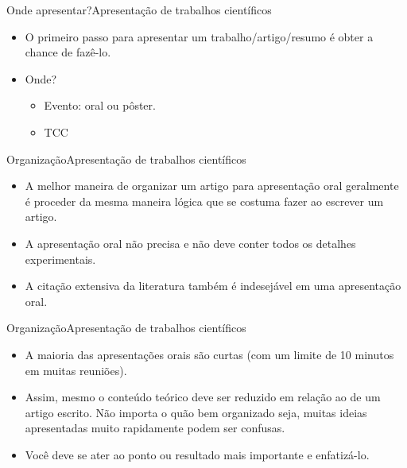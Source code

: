 \documentclass[t]{beamer}
\begin{document}
\begin{ftst}{Onde apresentar?}{Apresentação de trabalhos científicos}
\begin{itemize}
    \item O primeiro passo para apresentar um trabalho/artigo/resumo é obter a chance de fazê-lo.
    \vone
    \item Onde?
    \begin{itemize}
        \item Evento: oral ou pôster.
        \item TCC
    \end{itemize}
\end{itemize}
\end{ftst}


\begin{ftst}{Organização}{Apresentação de trabalhos científicos}
\begin{itemize}
    \item A melhor maneira de organizar um artigo para apresentação oral geralmente é proceder da mesma maneira lógica que se costuma fazer ao escrever um artigo.
    \item A apresentação oral não precisa e não deve conter todos os detalhes experimentais.
    \item A citação extensiva da literatura também é indesejável em uma apresentação oral.
\end{itemize}
\end{ftst}


\begin{ftst}{Organização}{Apresentação de trabalhos científicos}
\begin{itemize}
    \item A maioria das apresentações orais são curtas (com um limite de 10 minutos em muitas reuniões). 
    \item Assim, mesmo o conteúdo teórico deve ser reduzido em relação ao de um artigo escrito. Não importa o quão bem organizado seja, muitas ideias apresentadas muito rapidamente podem ser confusas. 
    \item Você deve se ater ao ponto ou resultado mais importante e enfatizá-lo. 
\end{itemize}
\end{ftst}

\end{document}
